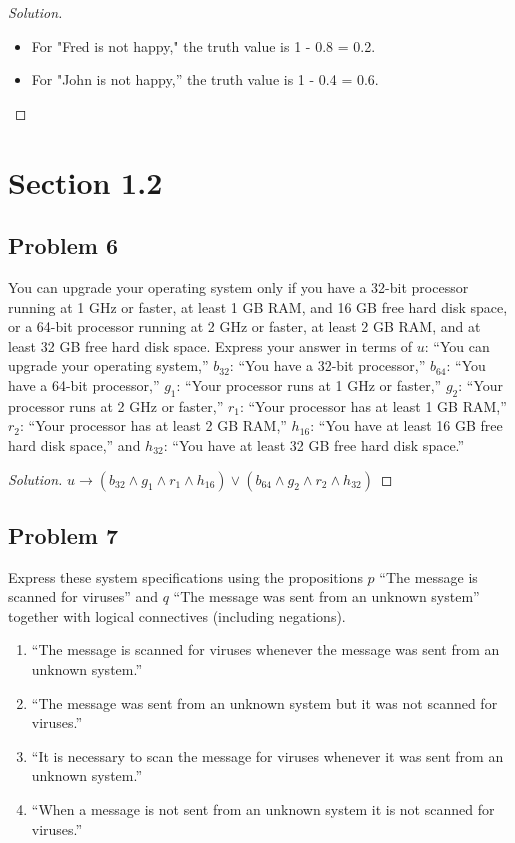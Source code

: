 \documentclass{article}
\newenvironment{solution}{\renewcommand\qedsymbol{}\begin{proof}[Solution]}{\end{proof}}
\begin{document}
\begin{solution}
\hspace{1pt}

\begin{itemize}[leftmargin=16pt, topsep = 8pt]
\item For "Fred is not happy," the truth value is 1 - 0.8 = 0.2.
\item For "John is not happy,'' the truth value is 1 - 0.4 = 0.6.
\end{itemize}
\end{solution}

\clearpage
\section*{Section 1.2}
\subsection*{Problem 6}
You can upgrade your operating system only if you have a 32-bit processor running at 1 GHz or faster, at least 1 GB RAM, and 16 GB free hard disk space, or a 64-bit processor running at 2 GHz or faster, at least 2 GB RAM, and at least 32 GB free hard disk space. Express your answer in terms of $u$: “You can upgrade your operating system,” $b_{32}$: “You have a 32-bit processor,” $b_{64}$: “You have a 64-bit processor,” $g_1$: “Your processor runs at 1 GHz or faster,” $g_2$: “Your processor runs at 2 GHz or
faster,” $r_1$: “Your processor has at least 1 GB RAM,” $r_2$: “Your processor has at least 2 GB RAM,” $h_{16}$: “You have at least 16 GB free hard disk space,” and $h_{32}$: “You have at least 32 GB free hard disk space.”

\begin{solution}
$u \rightarrow (b_{32} \land g_1 \land r_1 \land h_{16}) \lor (b_{64} \land g_2 \land r_2 \land h_{32})$
\end{solution}
\subsection*{Problem 7}
Express these system specifications using the propositions $p$ “The message is scanned for viruses” and $q$ “The message was sent from an unknown system” together with logical connectives (including negations).
\begin{enumerate}[leftmargin=16pt, topsep = 8pt]
\item “The message is scanned for viruses whenever the message was sent from an unknown system.”
\item “The message was sent from an unknown system but it was not scanned for viruses.”
\item “It is necessary to scan the message for viruses whenever it was sent from an unknown system.”
\item “When a message is not sent from an unknown system it is not scanned for viruses.”
\end{enumerate}
\end{document}
